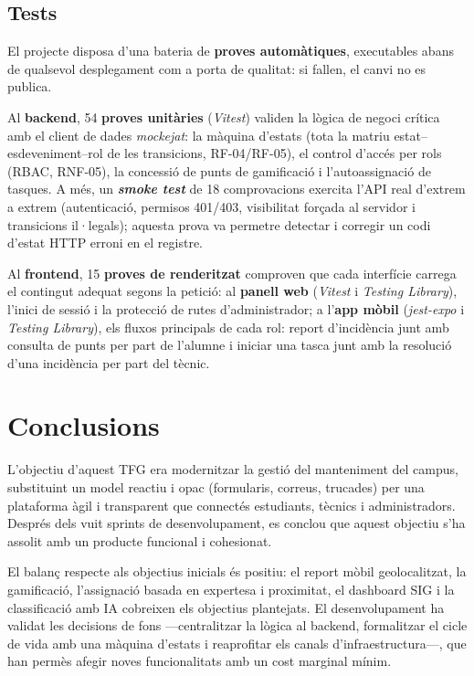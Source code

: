 \documentclass[10pt,a4paper,twocolumn,twoside]{article}
\begin{document}
		\subsection{Tests}
		El projecte disposa d'una bateria de \textbf{proves automàtiques}, executables abans de qualsevol desplegament com a porta de qualitat: si fallen, el canvi no es publica.
		
		Al \textbf{backend}, 54 \textbf{proves unitàries} (\textit{Vitest}) validen la lògica de negoci crítica amb el client de dades \textit{mockejat}: la màquina d'estats (tota la matriu estat–esdeveniment–rol de les transicions, RF-04/RF-05), el control d'accés per rols (RBAC, RNF-05), la concessió de punts de gamificació i l'autoassignació de tasques. A més, un \textbf{\textit{smoke test}} de 18 comprovacions exercita l'API real d'extrem a extrem (autenticació, permisos 401/403, visibilitat forçada al servidor i transicions il·legals); aquesta prova va permetre detectar i corregir un codi d'estat HTTP erroni en el registre.
		
		Al \textbf{frontend}, 15 \textbf{proves de renderitzat} comproven que cada interfície carrega el contingut adequat segons la petició: al \textbf{panell web} (\textit{Vitest} i \textit{Testing Library}), l'inici de sessió i la protecció de rutes d'administrador; a l'\textbf{app mòbil} (\textit{jest-expo} i \textit{Testing Library}), els fluxos principals de cada rol: report d'incidència junt amb consulta de punts per part de l'alumne i iniciar una tasca junt amb la resolució d'una incidència per part del tècnic.
		
		\section{Conclusions}
		
		L'objectiu d'aquest TFG era modernitzar la gestió del manteniment del campus, substituint un model reactiu i opac (formularis, correus, trucades) per una plataforma àgil i transparent que connectés estudiants, tècnics i administradors. Després dels vuit sprints de desenvolupament, es conclou que aquest objectiu s'ha assolit amb un producte funcional i cohesionat.
		
		El balanç respecte als objectius inicials és positiu: el report mòbil geolocalitzat, la gamificació, l'assignació basada en expertesa i proximitat, el dashboard SIG i la classificació amb IA cobreixen els objectius plantejats. El desenvolupament ha validat les decisions de fons —centralitzar la lògica al backend, formalitzar el cicle de vida amb una màquina d'estats i reaprofitar els canals d'infraestructura—, que han permès afegir noves funcionalitats amb un cost marginal mínim.
		
\end{document}
